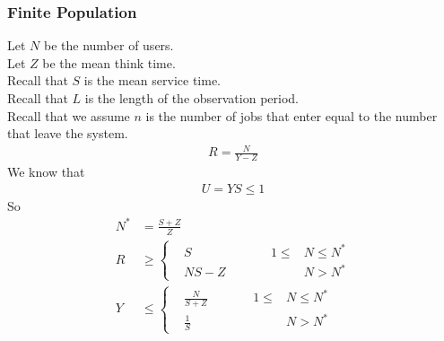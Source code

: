 \subsubsection{Finite Population}

Let $N$ be the number of users. \\
Let $Z$ be the mean think time. \\
Recall that $S$ is the mean service time. \\
Recall that $L$ is the length of the observation period. \\
Recall that we assume $n$ is the number of jobs that enter equal to the number
that leave the system.
\begin{equation*} \begin{split}
	R = \frac{N}{Y-Z}
\end{split} \end{equation*}
We know that
\begin{equation*} \begin{split}
	U = YS \le 1
\end{split} \end{equation*}
So
\begin{align*}
	N^*  & = \frac{S+Z}{Z} \\
	R & \ge 
	\left\{
		\begin{alignedat}{3}
			& S     & \qquad & 1 \le  & N \le N^* \\
			& NS-Z  & \qquad &        & N  >  N^*
		\end{alignedat}
	\right. \\
	Y & \le
	\left\{
		\begin{alignedat}{3}
			& \frac{N}{S+Z} & \qquad & 1 \le  & N \le N^* \\
			& \frac{1}{S}   & \qquad &        & N  >  N^*
		\end{alignedat}
	\right.
\end{align*}

